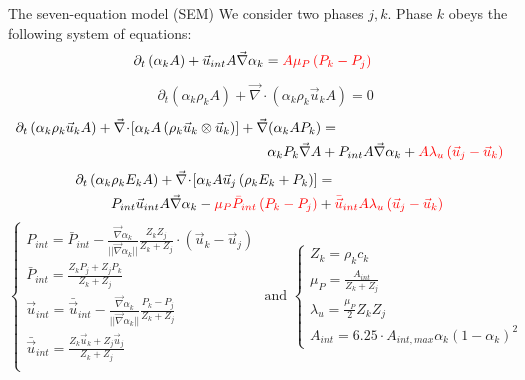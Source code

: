 \documentclass[xcolor=dvipsnames,10pt]{beamer}
\renewcommand{\div}{\vec{\nabla}\! \cdot \!}
\newcommand{\grad}{\vec{\nabla}}
\newcommand{\tcr}[1]{\textcolor{red}{#1}}
\begin{document}
\begin{frame}{The seven-equation model (SEM)}
We consider two phases ${j,k}$. Phase $k$ obeys the following system of equations:
\begin{align}
&\partial_t \left( \alpha_k  A\right) + \vec{u}_{int} A \grad \alpha_k = {\color{red}A \mu_P \left( P_k - P_j \right)} \nonumber
\end{align}
\begin{align}
&\partial_t \left( \alpha_k \rho_k A \right) + \div \left( \alpha_k \rho_k \vec{u}_k A \right) = 0 \nonumber
\end{align}
\begin{align}
\partial_t \left( \alpha_k \rho_k \vec{u}_k A \right) + \div \left[ \alpha_k A \left( \rho_k \vec{u}_k\otimes \vec{u}_k \right) \right]  + \grad(\alpha_k A P_k) &=  \nonumber \\
\alpha_k P_k \grad A &+  P_{int} A \grad \alpha_k +  {\color{red}A \lambda_u \left( \vec{u}_j - \vec{u}_k \right)} \nonumber
\end{align}
\begin{align}
\partial_t \left( \alpha_k \rho_k E_k A \right) + \div \left[ \alpha_k A \vec{u}_j \left( \rho_k E_k + P_k \right) \right] &= \nonumber\\
P_{int} \vec{u}_{int} A \grad \alpha_k - {\color{red}\mu_P \bar{P}_{int} \left( P_k-P_j \right)} &+{\color{red}\bar{\vec{u}}_{int} A \lambda_u \left( \vec{u}_j - \vec{u}_k \right)} \nonumber
\end{align}
\begin{equation}
\left\{
\begin{array}{l}
P_{int} = \bar{P}_{int} - \frac{\grad \alpha_k}{||\grad \alpha_k||} \frac{Z_k Z_j}{Z_k + Z_j} \cdot \left( \vec{u}_k-\vec{u}_j \right) \\
\bar{P}_{int} = \frac{Z_k P_j + Z_j P_k}{Z_k + Z_j} \\
\vec{u}_{int} = \bar{\vec{u}}_{int} - \frac{\grad \alpha_k}{||\grad \alpha_k||} \frac{P_k - P_j}{Z_k + Z_j} \\
\bar{\vec{u}}_{int} = \frac{Z_k \vec{u} _k + Z_j \vec{u}_j}{Z_k + Z_j} \\
\end{array}
\right.
\nonumber
\text{ and }
\left\{
\begin{array}{l}
Z_k = \rho_k c_k \\
\mu_P = \frac{A_{int}}{Z_k+Z_j} \\
\lambda_u = \frac{\mu_P}{2} Z_k Z_j \\
A_{int} = 6.25 \cdot A_{int,max} \alpha_k \left( 1-\alpha_k \right)^2
\end{array}
\right.
\end{equation}
\end{frame}
\end{document}
